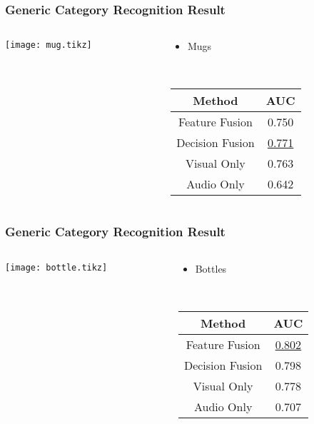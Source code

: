 \documentclass{beamer}
\begin{document}
  \begin{frame}
    \frametitle{Generic Category Recognition Result}

    \begin{columns}
      \begin{column}{.6\textwidth}
        \centering
        \footnotesize
        \texttt{[image: mug.tikz]}
      \end{column}
      \begin{column}{.4\textwidth}
        \begin{itemize}
          \item Mugs
        \end{itemize}
        ~

        \footnotesize
        \begin{tabular}[h]{c|c}
          \hline
          Method & AUC \\ \hline \hline
          Feature Fusion & 0.750 \\ \hline
          Decision Fusion  & \underline{0.771} \\ \hline
          Visual Only & 0.763 \\ \hline
          Audio Only & 0.642 \\ \hline
        \end{tabular}
      \end{column}
    \end{columns}
  \end{frame}

  \begin{frame}
    \frametitle{Generic Category Recognition Result}

    \begin{columns}
      \begin{column}{.6\textwidth}
        \centering
        \footnotesize
        \texttt{[image: bottle.tikz]}
      \end{column}
      \begin{column}{.4\textwidth}
        \begin{itemize}
          \item Bottles
        \end{itemize}
        ~

        \footnotesize
        \begin{tabular}[h]{c|c}
          \hline
          Method & AUC \\ \hline \hline
          Feature Fusion & \underline{0.802} \\ \hline
          Decision Fusion  & 0.798 \\ \hline
          Visual Only & 0.778 \\ \hline
          Audio Only & 0.707 \\ \hline
        \end{tabular}
      \end{column}
    \end{columns}
  \end{frame}
\end{document}
